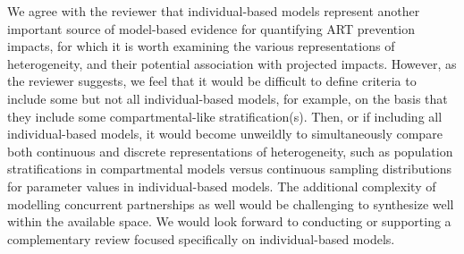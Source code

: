 \begin{comment}
It was not clear why the authors excluded individual-based approaches from this review. Although people tend to use the terms 'compartmental models' and 'deterministic models' interchangeably, some would argue the terms mean slightly different things (see Garnett, STIs, 2002, 78:7-12). The point is that it's possible for an individual-based model to be 'compartmental' in the sense that it works with categorical variables rather than continuously-defined variables. In such cases one could argue for including an individual-based model in the review, since its compartments/categories can be classified in the same way as a deterministic model. But even when key variables are defined on a continuous scale it's not clear why you would want to exclude the individual-based model from the review.
\end{comment}
\begin{response}
We agree with the reviewer that individual-based models represent
another important source of model-based evidence for quantifying ART prevention impacts,
for which it is worth examining the various representations of heterogeneity,
and their potential association with projected impacts.
However, as the reviewer suggests, we feel that it would be difficult to define
criteria to include some but not all individual-based models,
for example, on the basis that they include some compartmental-like stratification(s).
Then, or if including all individual-based models, it would become unweildly
to simultaneously compare both continuous and discrete representations of heterogeneity,
such as population stratifications in compartmental models versus
continuous sampling distributions for parameter values in individual-based models.
The additional complexity of modelling concurrent partnerships as well would be
challenging to synthesize well within the available space.
We would look forward to conducting or supporting a complementary review
focused specifically on individual-based models.
\end{response}
